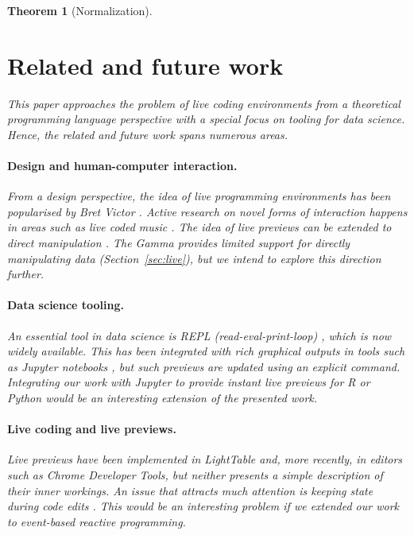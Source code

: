 \documentclass[acmsmall,anonymous,fleqn]{acmart}\settopmatter{printfolios=false,printccs=false,printacmref=false}
\newcounter{thc}
\theoremstyle{plain}
\newtheorem{theorem}[thc]{Theorem}
\theoremstyle{definition}
\begin{document}
\begin{theorem}[Normalization]

\section{Related and future work}
\label{sec:future}

This paper approaches the problem of live coding environments from a theoretical programming
language perspective with a special focus on tooling for data science. Hence, the related and
future work spans numerous areas.

\paragraph{Design and human-computer interaction.}
From a design perspective, the idea of live programming environments has been popularised by
Bret Victor \cite{learnable}. Active research on novel forms of interaction happens in areas
such as live coded music \cite{beyond,sonic}.
The idea of live previews can be extended to direct manipulation \cite{direct}. The Gamma
provides limited support for directly manipulating data (Section~\ref{sec:live}), but we
intend to explore this direction further.

\paragraph{Data science tooling.}
An essential tool in data science is REPL (read-eval-print-loop) \cite{drscheme}, which is now
widely available. This has been integrated with rich graphical outputs in tools such as Jupyter
notebooks \cite{jupyter,ipython}, but such previews are updated using an explicit command.
Integrating our work with Jupyter to provide instant live previews for R or Python would be
an interesting extension of the presented work.

\paragraph{Live coding and live previews.}
Live previews have been implemented in LightTable \cite{lighttable} and, more recently, in
editors such as Chrome Developer Tools, but neither presents a simple description of their
inner workings. An issue that attracts much attention is keeping state during code edits
\cite{alive,livingit}. This would be an interesting problem if we extended our work to
event-based reactive programming.


\end{theorem}
\end{document}
